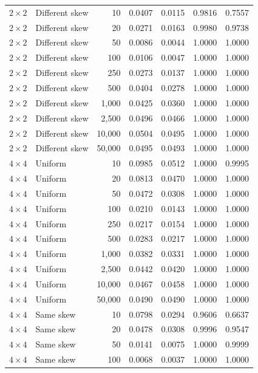 \begin{longtable}{@{}llrrrrr@{}}
\(2\times2\) & Different skew & 10 & 0.0407 & 0.0115 & 0.9816 & 0.7557\\
\(2\times2\) & Different skew & 20 & 0.0271 & 0.0163 & 0.9980 & 0.9738\\
\(2\times2\) & Different skew & 50 & 0.0086 & 0.0044 & 1.0000 & 1.0000\\
\(2\times2\) & Different skew & 100 & 0.0106 & 0.0047 & 1.0000 & 1.0000\\
\(2\times2\) & Different skew & 250 & 0.0273 & 0.0137 & 1.0000 & 1.0000\\
\(2\times2\) & Different skew & 500 & 0.0404 & 0.0278 & 1.0000 & 1.0000\\
\(2\times2\) & Different skew & 1,000 & 0.0425 & 0.0360 & 1.0000 & 1.0000\\
\(2\times2\) & Different skew & 2,500 & 0.0496 & 0.0466 & 1.0000 & 1.0000\\
\(2\times2\) & Different skew & 10,000 & 0.0504 & 0.0495 & 1.0000 & 1.0000\\
\(2\times2\) & Different skew & 50,000 & 0.0495 & 0.0493 & 1.0000 & 1.0000\\
\midrule
\(4\times4\) & Uniform & 10 & 0.0985 & 0.0512 & 1.0000 & 0.9995\\
\(4\times4\) & Uniform & 20 & 0.0813 & 0.0470 & 1.0000 & 1.0000\\
\(4\times4\) & Uniform & 50 & 0.0472 & 0.0308 & 1.0000 & 1.0000\\
\(4\times4\) & Uniform & 100 & 0.0210 & 0.0143 & 1.0000 & 1.0000\\
\(4\times4\) & Uniform & 250 & 0.0217 & 0.0154 & 1.0000 & 1.0000\\
\(4\times4\) & Uniform & 500 & 0.0283 & 0.0217 & 1.0000 & 1.0000\\
\(4\times4\) & Uniform & 1,000 & 0.0382 & 0.0331 & 1.0000 & 1.0000\\
\(4\times4\) & Uniform & 2,500 & 0.0442 & 0.0420 & 1.0000 & 1.0000\\
\(4\times4\) & Uniform & 10,000 & 0.0467 & 0.0458 & 1.0000 & 1.0000\\
\(4\times4\) & Uniform & 50,000 & 0.0490 & 0.0490 & 1.0000 & 1.0000\\
\(4\times4\) & Same skew & 10 & 0.0798 & 0.0294 & 0.9606 & 0.6637\\
\(4\times4\) & Same skew & 20 & 0.0478 & 0.0308 & 0.9996 & 0.9547\\
\(4\times4\) & Same skew & 50 & 0.0141 & 0.0075 & 1.0000 & 0.9999\\
\(4\times4\) & Same skew & 100 & 0.0068 & 0.0037 & 1.0000 & 1.0000\\

\end{longtable}
